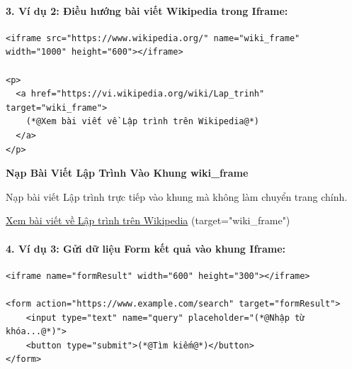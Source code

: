 \documentclass[11pt,oneside]{book}
\begin{document}
\paragraph{3. Ví dụ 2: Điều hướng bài viết Wikipedia trong Iframe:}
\begin{codeWindow}
\begin{lstlisting}[language=HTML5]
<iframe src="https://www.wikipedia.org/" name="wiki_frame" width="1000" height="600"></iframe>

<p>
  <a href="https://vi.wikipedia.org/wiki/Lap_trinh" target="wiki_frame">
    (*@Xem bài viết về Lập trình trên Wikipedia@*)
  </a>
</p>
\end{lstlisting}
\end{codeWindow}

\begin{browserWindow}[https://vi.wikipedia.org/wiki/Lap\_trinh (name="wiki\_frame")]
\centering\sffamily\vspace{4pt}
{\bfseries\color{primaryBlue}\large Nạp Bài Viết Lập Trình Vào Khung wiki\_frame} \par\vspace{6pt}
{\small\color{darkText} Nạp bài viết Lập trình trực tiếp vào khung mà không làm chuyển trang chính.} \par\vspace{4pt}
\textcolor{primaryBlue}{\underline{Xem bài viết về Lập trình trên Wikipedia}} \quad \small\textcolor{codeComment}{(target="wiki\_frame")} \par\vspace{4pt}
\end{browserWindow}

\paragraph{4. Ví dụ 3: Gửi dữ liệu Form kết quả vào khung Iframe:}
\begin{codeWindow}
\begin{lstlisting}[language=HTML5]
<iframe name="formResult" width="600" height="300"></iframe>

<form action="https://www.example.com/search" target="formResult">
    <input type="text" name="query" placeholder="(*@Nhập từ khóa...@*)">
    <button type="submit">(*@Tìm kiếm@*)</button>
</form>
\end{lstlisting}
\end{codeWindow}
\end{document}
